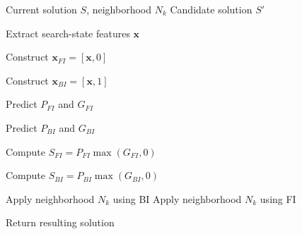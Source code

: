 \begin{algorithm}[ht]
\caption{RF-Based Adaptive Strategy Selection}
\label{alg:rf_selector}
\begin{algorithmic}[1]

\Require Current solution $S$, neighborhood $N_k$
\Ensure Candidate solution $S'$

\State Extract search-state features $\mathbf{x}$

\State Construct
$\mathbf{x}_{FI}=[\mathbf{x},0]$

\State Construct
$\mathbf{x}_{BI}=[\mathbf{x},1]$

\State Predict
$P_{FI}$ and $G_{FI}$

\State Predict
$P_{BI}$ and $G_{BI}$

\State Compute
$S_{FI}=P_{FI}\max(G_{FI},0)$

\State Compute
$S_{BI}=P_{BI}\max(G_{BI},0)$

    \State Apply neighborhood $N_k$ using BI
\Else
    \State Apply neighborhood $N_k$ using FI
\EndIf

\State Return resulting solution

\end{algorithmic}
\end{algorithm}
